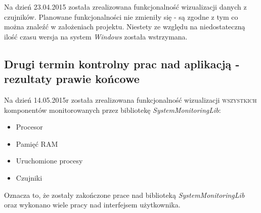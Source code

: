 \documentclass[a4paper]{article}
\begin{document}
Na dzień 23.04.2015 została zrealizowana funkcjonalność wizualizacji danych z czujników. Planowane funkcjonalności nie zmieniły się - są zgodne z tym co można znaleźć w założeniach projektu. Niestety ze względu na niedostateczną ilość czasu wersja na system \textit{Windows} została wstrzymana.

\subsection{Drugi termin kontrolny prac nad aplikacją - rezultaty prawie końcowe}
Na dzień 14.05.2015r została zrealizowana funkcjonalność wizualizacji \textsc{wszystkich} komponentów monitorowanych przez bibliotekę \textit{SystemMonitoringLib}:
	\begin{itemize}
		\item Procesor
		\item Pamięć \textsc{RAM}
		\item Uruchomione procesy
		\item Czujniki
	\end{itemize}
Oznacza to, że zostały zakończone prace nad biblioteką \textit{SystemMonitoringLib} oraz wykonano wiele pracy nad interfejsem użytkownika.
\end{document}
